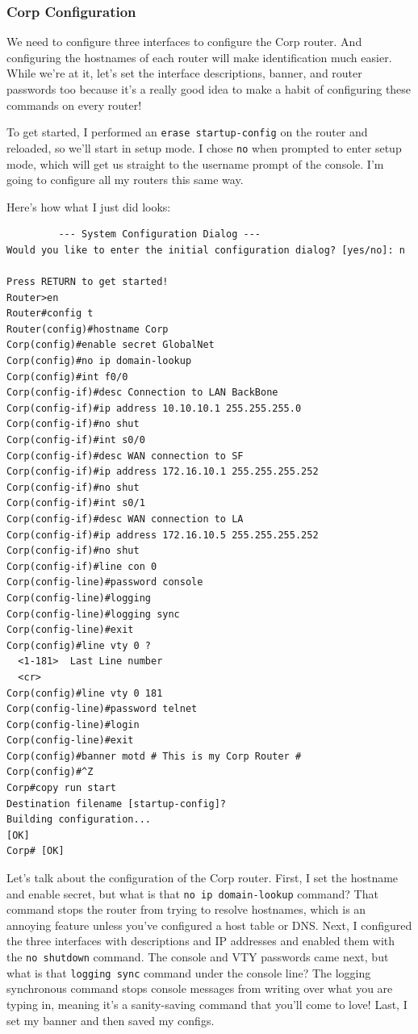 \subsubsection[Corp
Configuration]{\texorpdfstring{\protect\hypertarget{c09.xhtmlux5cux23c09-sec-6}{}{}Corp
Configuration}{Corp Configuration}}

We need to configure three interfaces to configure the Corp router. And
configuring the hostnames of each router will make identification much
easier. While we're at it, let's set the interface descriptions, banner,
and router passwords too because it's a really good idea to make a habit
of configuring these commands on every router!

To get started, I performed an \texttt{erase\ startup-config} on the
router and reloaded, so we'll start in setup mode. I chose \texttt{no}
when prompted to enter setup mode, which will get us straight to the
username prompt of the console. I'm going to configure all my routers
this same way.

Here's how what I just did looks:

\begin{verbatim}
         --- System Configuration Dialog ---
Would you like to enter the initial configuration dialog? [yes/no]: n
 
Press RETURN to get started!
Router>en
Router#config t
Router(config)#hostname Corp
Corp(config)#enable secret GlobalNet
Corp(config)#no ip domain-lookup
Corp(config)#int f0/0
Corp(config-if)#desc Connection to LAN BackBone
Corp(config-if)#ip address 10.10.10.1 255.255.255.0
Corp(config-if)#no shut
Corp(config-if)#int s0/0
Corp(config-if)#desc WAN connection to SF
Corp(config-if)#ip address 172.16.10.1 255.255.255.252
Corp(config-if)#no shut
Corp(config-if)#int s0/1
Corp(config-if)#desc WAN connection to LA
Corp(config-if)#ip address 172.16.10.5 255.255.255.252
Corp(config-if)#no shut
Corp(config-if)#line con 0
Corp(config-line)#password console
Corp(config-line)#logging
Corp(config-line)#logging sync
Corp(config-line)#exit
Corp(config)#line vty 0 ?
  <1-181>  Last Line number
  <cr>
Corp(config)#line vty 0 181
Corp(config-line)#password telnet
Corp(config-line)#login
Corp(config-line)#exit
Corp(config)#banner motd # This is my Corp Router #
Corp(config)#^Z
Corp#copy run start
Destination filename [startup-config]?
Building configuration...
[OK]
Corp# [OK]
\end{verbatim}

Let's talk about the configuration of the Corp router. First, I set the
hostname and enable secret, but what is that
\texttt{no\ ip\ domain-lookup} command? That command stops the router
from trying to resolve hostnames, which is an annoying feature unless
you've configured a host table or DNS. Next, I configured the three
interfaces with descriptions and IP addresses and enabled them with the
\texttt{no\ shutdown} command. The console and VTY passwords came next,
but what is that \texttt{logging\ sync} command under the console line?
The logging synchronous command stops console messages from writing over
what you are typing in, meaning it's a sanity-saving command that you'll
come to love! Last, I set my banner and then saved my configs.

